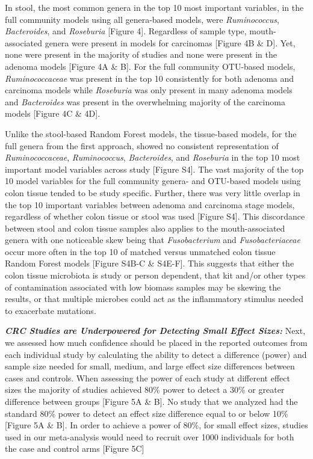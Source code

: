 \documentclass[12pt,]{article}
\begin{document}
In stool, the most common genera in the top 10 most important variables,
in the full community models using all genera-based models, were
\emph{Ruminococcus}, \emph{Bacteroides}, and \emph{Roseburia} {[}Figure
4{]}. Regardless of sample type, mouth-associated genera were present in
models for carcinomas {[}Figure 4B \& D{]}. Yet, none were present in
the majority of studies and none were present in the adenoma models
{[}Figure 4A \& B{]}. For the full community OTU-based models,
\emph{Ruminococcaceae} was present in the top 10 consistently for both
adenoma and carcinoma models while \emph{Roseburia} was only present in
many adenoma models and \emph{Bacteroides} was present in the
overwhelming majority of the carcinoma models {[}Figure 4C \& 4D{]}.

Unlike the stool-based Random Forest models, the tissue-based models,
for the full genera from the first approach, showed no consistent
representation of \emph{Ruminococcaceae}, \emph{Ruminococcus},
\emph{Bacteroides}, and \emph{Roseburia} in the top 10 most important
model variables across study {[}Figure S4{]}. The vast majority of the
top 10 model variables for the full community genera- and OTU-based
models using colon tissue tended to be study specific. Further, there
was very little overlap in the top 10 important variables between
adenoma and carcinoma stage models, regardless of whether colon tissue
or stool was used {[}Figure S4{]}. This discordance between stool and
colon tissue samples also applies to the mouth-associated genera with
one noticeable skew being that \emph{Fusobacterium} and
\emph{Fusobacteriaceae} occur more often in the top 10 of matched versus
unmatched colon tissue Random Forest models {[}Figure S4B-C \& S4E-F{]}.
This suggests that either the colon tissue microbiota is study or person
dependent, that kit and/or other types of contamination associated with
low biomass samples may be skewing the results, or that multiple
microbes could act as the inflammatory stimulus needed to exacerbate
mutations.

\textbf{\emph{CRC Studies are Underpowered for Detecting Small Effect
Sizes:}} Next, we assessed how much confidence should be placed in the
reported outcomes from each individual study by calculating the ability
to detect a difference (power) and sample size needed for small, medium,
and large effect size differences between cases and controls. When
assessing the power of each study at different effect sizes the majority
of studies achieved 80\% power to detect a 30\% or greater difference
between groups {[}Figure 5A \& B{]}. No study that we analyzed had the
standard 80\% power to detect an effect size difference equal to or
below 10\% {[}Figure 5A \& B{]}. In order to achieve a power of 80\%,
for small effect sizes, studies used in our meta-analysis would need to
recruit over 1000 individuals for both the case and control arms
{[}Figure 5C{]}
\end{document}
